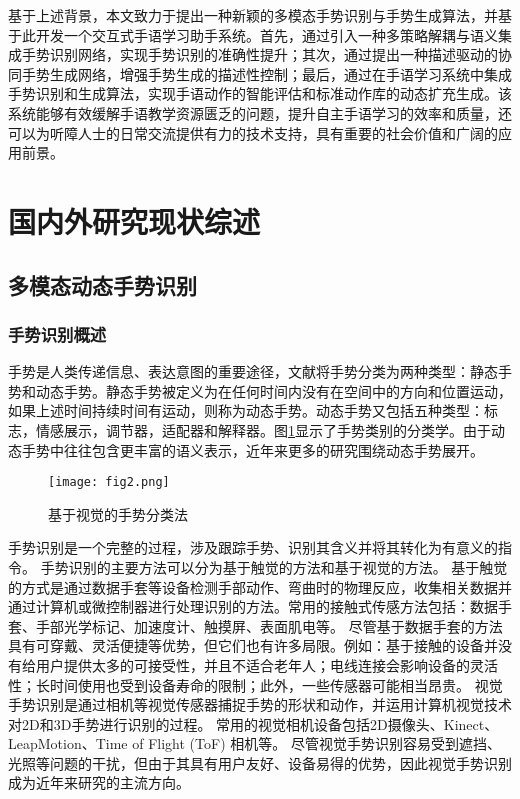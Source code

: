 基于上述背景，本文致力于提出一种新颖的多模态手势识别与手势生成算法，并基于此开发一个交互式手语学习助手系统。首先，通过引入一种多策略解耦与语义集成手势识别网络，实现手势识别的准确性提升；其次，通过提出一种描述驱动的协同手势生成网络，增强手势生成的描述性控制；最后，通过在手语学习系统中集成手势识别和生成算法，实现手语动作的智能评估和标准动作库的动态扩充生成。该系统能够有效缓解手语教学资源匮乏的问题，提升自主手语学习的效率和质量，还可以为听障人士的日常交流提供有力的技术支持，具有重要的社会价值和广阔的应用前景。



\section{国内外研究现状综述}
\subsection{多模态动态手势识别}
\subsubsection{手势识别概述}
手势是人类传递信息、表达意图的重要途径，文献\cite{kaaniche2009gesture, rautaray2015vision}将手势分类为两种类型：静态手势和动态手势。静态手势被定义为在任何时间内没有在空间中的方向和位置运动，如果上述时间持续时间有运动，则称为动态手势。动态手势又包括五种类型\cite{ottenheimer2018anthropology}：标志，情感展示，调节器，适配器和解释器。图\ref{fig:gesture_taxonomies}显示了手势类别的分类学。由于动态手势中往往包含更丰富的语义表示，近年来更多的研究围绕动态手势展开。
\begin{figure}
  \centering
  \texttt{[image: fig2.png]}
  \caption{基于视觉的手势分类法\cite{rautaray2015vision}}
  \label{fig:gesture_taxonomies}
\end{figure}

手势识别是一个完整的过程，涉及跟踪手势、识别其含义并将其转化为有意义的指令\cite{rautaray2015vision}。
手势识别的主要方法可以分为基于触觉的方法和基于视觉的方法\cite{oudah2020hand,rautaray2015vision}。
基于触觉的方式是通过数据手套等设备检测手部动作、弯曲时的物理反应，收集相关数据并通过计算机或微控制器进行处理识别的方法。常用的接触式传感方法包括：数据手套、手部光学标记、加速度计、触摸屏、表面肌电等\cite{oudah2020hand}。
尽管基于数据手套的方法具有可穿戴、灵活便捷等优势，但它们也有许多局限。例如：基于接触的设备并没有给用户提供太多的可接受性\cite{rautaray2015vision}，并且不适合老年人；电线连接会影响设备的灵活性；长时间使用也受到设备寿命的限制；此外，一些传感器可能相当昂贵\cite{oudah2020hand}。
视觉手势识别是通过相机等视觉传感器捕捉手势的形状和动作，并运用计算机视觉技术对2D和3D手势进行识别的过程。
常用的视觉相机设备包括2D摄像头、Kinect、LeapMotion、Time of Flight (ToF) 相机等\cite{基于视觉的动态手势识别研究综述}。
尽管视觉手势识别容易受到遮挡、光照等问题的干扰，但由于其具有用户友好、设备易得的优势，因此视觉手势识别成为近年来研究的主流方向。

